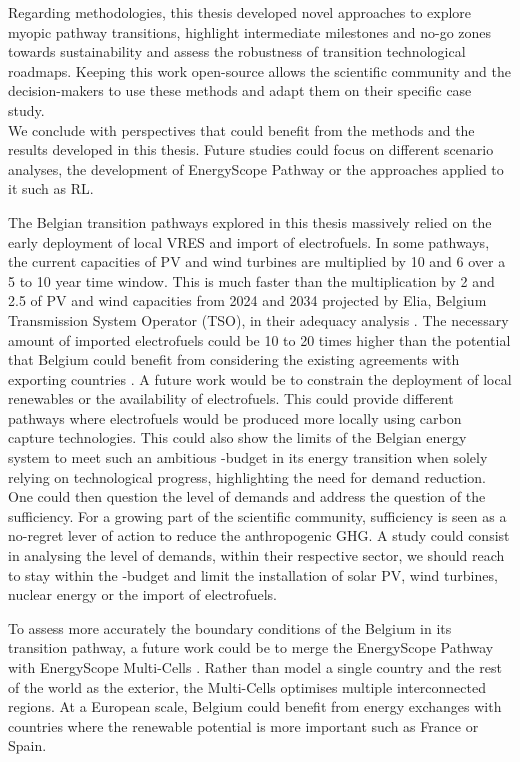 Regarding methodologies, this thesis developed novel approaches to explore myopic pathway transitions, highlight intermediate milestones and no-go zones towards sustainability and assess the robustness of transition technological roadmaps. Keeping this work open-source allows the scientific community and the decision-makers to use these methods and adapt them on their specific case study. \\


We conclude with perspectives that could benefit from the methods and the results developed in this thesis.  Future studies could focus on different scenario analyses, the development of EnergyScope Pathway or the approaches applied to it such as \gls{RL}. 

The Belgian transition pathways explored in this thesis massively relied on the early deployment of local \gls{VRES} and import of electrofuels. In some pathways, the current capacities of \gls{PV} and wind turbines are multiplied by 10 and 6 over a 5 to 10 year time window. This is much faster than the multiplication by 2 and 2.5 of PV and wind capacities from 2024 and 2034 projected by Elia, Belgium Transmission System Operator (TSO), in their adequacy analysis \cite{Elia_2024_2034}. The necessary amount of imported electrofuels could be 10 to 20 times higher than the potential that Belgium could benefit from considering the existing agreements with exporting countries \cite{lefebvre2022electrofuel}. A future work would be to constrain the deployment of local renewables or the availability of electrofuels. This could provide different pathways where electrofuels would be produced more locally using carbon capture technologies. This could also show the limits of the Belgian energy system to meet such an ambitious -budget in its energy transition when solely relying on technological progress, highlighting the need for demand reduction. One could then question the level of demands and address the question of the sufficiency. For a growing part of the scientific community, sufficiency is seen as a no-regret lever of action to reduce the anthropogenic \gls{GHG}. A study could consist in analysing the level of demands, within their respective sector, we should reach to stay within the -budget and limit the installation of solar PV, wind turbines, nuclear energy or the import of electrofuels.

To assess more accurately the boundary conditions of the Belgium in its transition pathway, a future work could be to merge the EnergyScope Pathway with EnergyScope Multi-Cells \cite{thiran2023validation}. Rather than model a single country and the rest of the world as the exterior, the Multi-Cells optimises multiple interconnected regions. At a European scale, Belgium could benefit from energy exchanges with countries where the renewable potential is more important such as France or Spain. 

